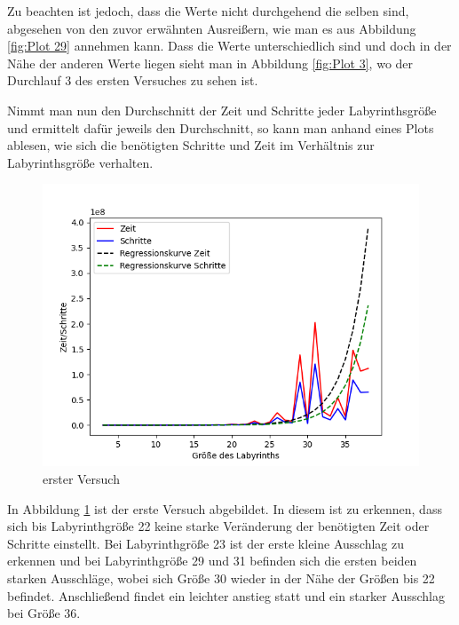 \documentclass[12pt, a4paper, titlepage]{article}
\begin{document}
Zu beachten ist jedoch, dass die Werte nicht durchgehend die selben sind, abgesehen von den zuvor erwähnten Ausreißern, wie man es aus Abbildung \ref{fig:Plot 29} annehmen kann.
Dass die Werte unterschiedlich sind und doch in der Nähe der anderen Werte liegen sieht man in Abbildung \ref{fig:Plot 3}, wo der Durchlauf 3 des ersten Versuches zu sehen ist.

Nimmt man nun den Durchschnitt der Zeit und Schritte jeder Labyrinthsgröße und ermittelt dafür jeweils den Durchschnitt, so kann man anhand eines Plots ablesen, wie sich die benötigten Schritte und Zeit im Verhältnis zur Labyrinthsgröße verhalten.

\begin{figure}[h]
	\centering
	\includegraphics[scale=.5]{v1Aus.png}
	\caption{erster Versuch}
	\label{fig:Plot v1}
\end{figure}
 
In Abbildung \ref{fig:Plot v1} ist der erste Versuch abgebildet.
In diesem ist zu erkennen, dass sich bis Labyrinthgröße 22 keine starke Veränderung der benötigten Zeit oder Schritte einstellt.
Bei Labyrinthgröße 23 ist der erste kleine Ausschlag zu erkennen und bei Labyrinthgröße 29 und 31 befinden sich die ersten beiden starken Ausschläge, wobei sich Größe 30 wieder in der Nähe der Größen bis 22 befindet.
Anschließend findet ein leichter anstieg statt und ein starker Ausschlag bei Größe 36.
\end{document}
